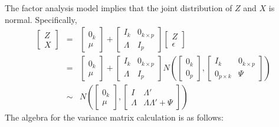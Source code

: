 \documentclass[12pt]{article}
\theoremstyle{definition}
\begin{document}
The factor analysis model implies that the joint distribution of $Z$ and $X$ is normal. Specifically,
\begin{eqnarray*}
	\left[\begin{array}{c}
	Z\\ X
	\end{array}\right] &=& 
		\left[\begin{array}{c}
	0_k\\ \mu
	\end{array}\right] + \left[\begin{array}{cc}
		I_k & 0_{k\times p} \\ \Lambda & I_{p}
	\end{array}\right]\left[\begin{array}{c}
		Z \\ \epsilon
	\end{array} \right]\\
	& = & \left[\begin{array}{c}
	0_k\\ \mu
	\end{array}\right] + \left[\begin{array}{cc}
		I_k & 0_{k\times p} \\ \Lambda & I_{p}
	\end{array}\right]
	N\left(\left[\begin{array}{c}
		0_k \\ 0_p
	\end{array} \right], \left[\begin{array}{cc}
		I_k & 0_{k\times p} \\ 0_{p\times k} & \Psi
	\end{array}\right]\right)\\
	&\sim & N\left(\left[\begin{array}{c}
	0_k \\ \mu
	\end{array}\right], \left[\begin{array}{cc}
		I & \Lambda'\\
		\Lambda & \Lambda \Lambda' + \Psi
	\end{array} \right] \right)
\end{eqnarray*}
The algebra for the variance matrix calculation is as follows:
\end{document}
